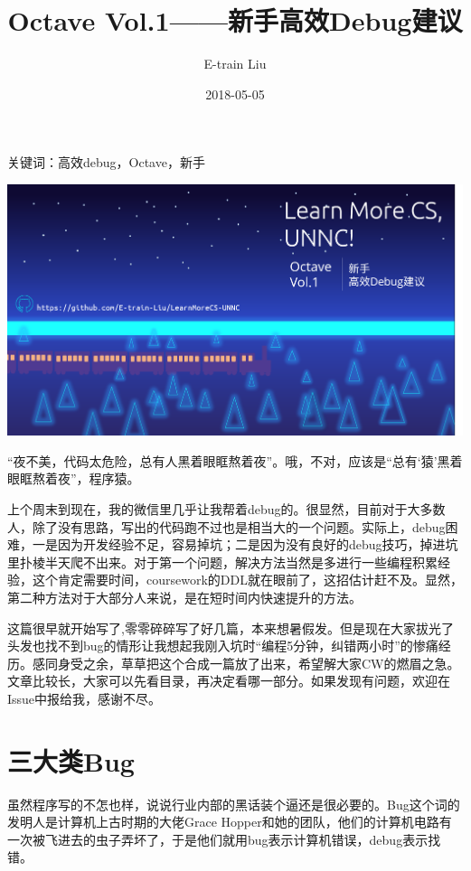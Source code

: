 \documentclass[12pt]{article}
\title{Octave Vol.1——新手高效Debug建议}
\author{E-train Liu}
\date{2018-05-05}
\begin{document}
\begin{spacing}{1.4}

\tableofcontents


\maketitle
\begin{center}
\large{关键词：高效debug，Octave，新手}
\end{center}

\includegraphics[width=\linewidth]{titlePicture.png}

“夜不美，代码太危险，总有人黑着眼眶熬着夜”。哦，不对，应该是“总有‘猿’黑着眼眶熬着夜”，程序猿。

上个周末到现在，我的微信里几乎让我帮着debug的。很显然，目前对于大多数人，除了没有思路，写出的代码跑不过也是相当大的一个问题。实际上，debug困难，一是因为开发经验不足，容易掉坑；二是因为没有良好的debug技巧，掉进坑里扑棱半天爬不出来。对于第一个问题，解决方法当然是多进行一些编程积累经验，这个肯定需要时间，coursework的DDL就在眼前了，这招估计赶不及。显然，第二种方法对于大部分人来说，是在短时间内快速提升的方法。

这篇很早就开始写了,零零碎碎写了好几篇，本来想暑假发。但是现在大家拔光了头发也找不到bug的情形让我想起我刚入坑时“编程5分钟，纠错两小时”的惨痛经历。感同身受之余，草草把这个合成一篇放了出来，希望解大家CW的燃眉之急。文章比较长，大家可以先看目录，再决定看哪一部分。如果发现有问题，欢迎在Issue中报给我，感谢不尽。

\section{三大类Bug}

虽然程序写的不怎也样，说说行业内部的黑话装个逼还是很必要的。Bug这个词的发明人是计算机上古时期的大佬Grace Hopper和她的团队，他们的计算机电路有一次被飞进去的虫子弄坏了，于是他们就用bug表示计算机错误，debug表示找错。


\end{spacing}
\end{document}
